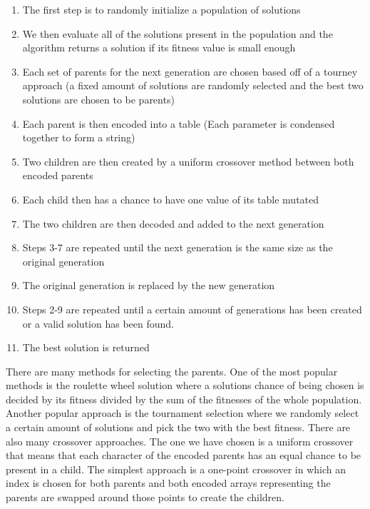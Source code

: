 \documentclass{book}
\begin{document}
\begin{enumerate}
   \item The first step is to randomly initialize a population of solutions
   \item We then evaluate all of the solutions present in the population and the algorithm returns a solution if its fitness value is small enough
   \item Each set of parents for the next generation are chosen based off of a tourney approach (a fixed amount of solutions are randomly selected and the best two solutions are
   chosen to be parents)
   \item Each parent is then encoded into a table (Each parameter is condensed together to form a string)
   \item Two children are then created by a uniform crossover method between both encoded parents
   \item Each child then has a chance to have one value of its table mutated
   \item The two children are then decoded and added to the next generation
   \item Steps 3-7 are repeated until the next generation is the same size as the original generation
   \item The original generation is replaced by the new generation
   \item Steps 2-9 are repeated until a certain amount of generations has been created or a valid solution has been found.
   \item The best solution is returned
\end{enumerate}

There are many methods for selecting the parents. One of the most popular methods is the roulette wheel solution where a solutions chance of being chosen is decided by its fitness
divided by the sum of the fitnesses of the whole population. Another popular approach is the tournament selection where we randomly select a certain amount of solutions and pick the two
with the best fitness. There are also many crossover approaches. The one we have chosen is a uniform crossover that means that each character of the encoded parents has an equal chance
to be present in a child. The simplest approach is a one-point crossover in which an index is chosen for both parents and both encoded arrays representing the parents
are swapped around those points to create the children.
\end{document}
